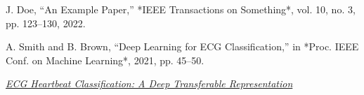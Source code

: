 \documentclass[10pt, conference]{IEEEtran}
\begin{document}
	\begin{thebibliography}{99}
		
		J. Doe, “An Example Paper,” *IEEE Transactions on Something*, vol. 10, no. 3, pp. 123–130, 2022.
		
		A. Smith and B. Brown, “Deep Learning for ECG Classification,” in *Proc. IEEE Conf. on Machine Learning*, 2021, pp. 45–50.
		
		\emph{\href{https://arxiv.org/abs/2401.12345}{ECG Heartbeat Classification: A Deep Transferable Representation}}
		
	\end{thebibliography}
	
\end{document}
